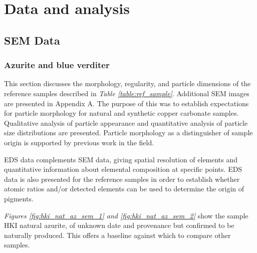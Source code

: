 \chapter{Data and analysis}

\ifpdf
    \graphicspath{{Chapter3/Figs/Raster/}{Chapter3/Figs/PDF/}{Chapter3/Figs/}}
\else
    \graphicspath{{Chapter3/Figs/Vector/}{Chapter3/Figs/}}
\fi

\section[SEM Data]{SEM Data}
\label{section3.1}

\subsection[Azurite and blue verditer]{Azurite and blue verditer}
\label{subsection3.1.1}

This section discusses the morphology, regularity, and particle dimensions of the reference samples described in \textit{Table \ref{table:ref_sample}}. Additional SEM images are presented in Appendix A. The purpose of this was to establish expectations for particle morphology for natural and synthetic copper carbonate samples. Qualitative analysis of particle appearance and quantitative analysis of particle size distributions are presented. Particle morphology as a distinguisher of sample origin is supported by previous work in the field.~\autocite{MacTaggart,Naumova1994,Naumova1990,Keith2003}

EDS data complements SEM data, giving spatial resolution of elements and quantitative information about elemental composition at specific points. EDS data is also presented for the reference samples in order to establish whether atomic ratios and/or detected elements can be used to determine the origin of pigments.



\textit{Figures \ref{fig:hki_nat_az_sem_1} and \ref{fig:hki_nat_az_sem_2}} show the sample HKI natural azurite, of unknown date and provenance but confirmed to be naturally produced. This offers a baseline against which to compare other samples. 

